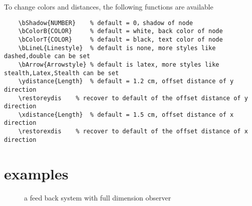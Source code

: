 \documentclass[a4paper,onecolumn]{IEEETran}
\begin{document}
To change colors and distances, the following functions are available

\begin{verbatim}
    \bShadow{NUMBER}  	% default = 0，shadow of node
    \bColorB{COLOR}   	% default = white, back color of node
    \bColorT{COLOR}		% default = black, text color of node
    \bLineL{Linestyle}  % default is none, more styles like dashed,double can be set
    \bArrow{Arrowstyle} % default is latex, more styles like stealth,Latex,Stealth can be set
    \ydistance{Length}	% default = 1.2 cm, offset distance of y direction
    \restoreydis    % recover to default of the offset distance of y direction
    \xdistance{Length}	% default = 1.5 cm, offset distance of x direction
    \restorexdis 	% recover to default of the offset distance of x direction
\end{verbatim}


\newpage

\section{examples}


\begin{figure}[!htbp]
    \caption{a feed back system with full dimension observer}
\end{figure}
\end{document}
